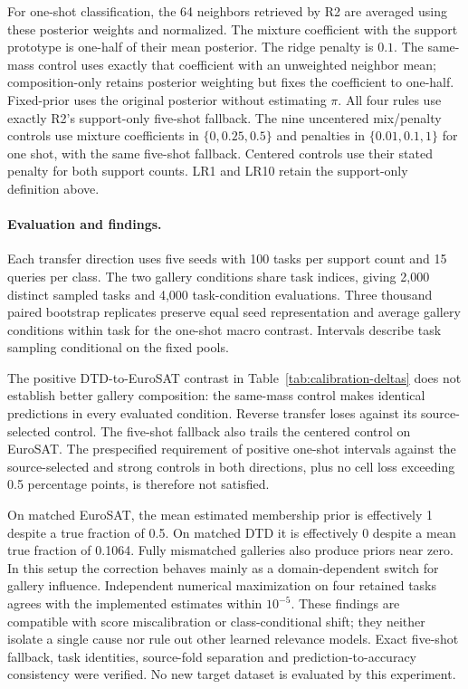 For one-shot classification, the 64 neighbors retrieved by R2 are averaged using these posterior weights and normalized. The mixture coefficient with the support prototype is one-half of their mean posterior. The ridge penalty is $0.1$. The same-mass control uses exactly that coefficient with an unweighted neighbor mean; composition-only retains posterior weighting but fixes the coefficient to one-half. Fixed-prior uses the original posterior without estimating $\pi$. All four rules use exactly R2's support-only five-shot fallback. The nine uncentered mix/penalty controls use mixture coefficients in $\{0,0.25,0.5\}$ and penalties in $\{0.01,0.1,1\}$ for one shot, with the same five-shot fallback. Centered controls use their stated penalty for both support counts. LR1 and LR10 retain the support-only definition above.

\paragraph{Evaluation and findings.}
Each transfer direction uses five seeds with 100 tasks per support count and 15 queries per class. The two gallery conditions share task indices, giving 2,000 distinct sampled tasks and 4,000 task-condition evaluations. Three thousand paired bootstrap replicates preserve equal seed representation and average gallery conditions within task for the one-shot macro contrast. Intervals describe task sampling conditional on the fixed pools.




The positive DTD-to-EuroSAT contrast in Table~\ref{tab:calibration-deltas} does not establish better gallery composition: the same-mass control makes identical predictions in every evaluated condition. Reverse transfer loses against its source-selected control. The five-shot fallback also trails the centered control on EuroSAT. The prespecified requirement of positive one-shot intervals against the source-selected and strong controls in both directions, plus no cell loss exceeding 0.5 percentage points, is therefore not satisfied.

On matched EuroSAT, the mean estimated membership prior is effectively 1 despite a true fraction of 0.5. On matched DTD it is effectively 0 despite a mean true fraction of 0.1064. Fully mismatched galleries also produce priors near zero. In this setup the correction behaves mainly as a domain-dependent switch for gallery influence. Independent numerical maximization on four retained tasks agrees with the implemented estimates within $10^{-5}$. These findings are compatible with score miscalibration or class-conditional shift; they neither isolate a single cause nor rule out other learned relevance models. Exact five-shot fallback, task identities, source-fold separation and prediction-to-accuracy consistency were verified. No new target dataset is evaluated by this experiment.

